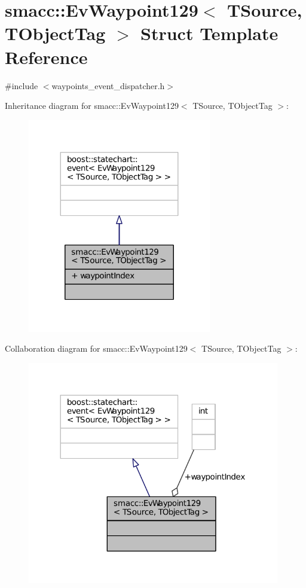 \hypertarget{structsmacc_1_1EvWaypoint129}{}\section{smacc\+:\+:Ev\+Waypoint129$<$ T\+Source, T\+Object\+Tag $>$ Struct Template Reference}
\label{structsmacc_1_1EvWaypoint129}


{\ttfamily \#include $<$waypoints\+\_\+event\+\_\+dispatcher.\+h$>$}



Inheritance diagram for smacc\+:\+:Ev\+Waypoint129$<$ T\+Source, T\+Object\+Tag $>$\+:
\nopagebreak
\begin{figure}[H]
\begin{center}
\leavevmode
\includegraphics[width=227pt]{structsmacc_1_1EvWaypoint129__inherit__graph}
\end{center}
\end{figure}


Collaboration diagram for smacc\+:\+:Ev\+Waypoint129$<$ T\+Source, T\+Object\+Tag $>$\+:
\nopagebreak
\begin{figure}[H]
\begin{center}
\leavevmode
\includegraphics[width=312pt]{structsmacc_1_1EvWaypoint129__coll__graph}
\end{center}
\end{figure}
